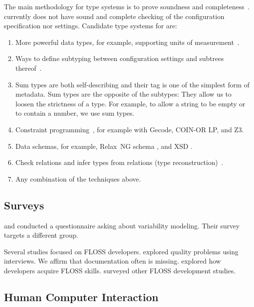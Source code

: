 The main methodology for type systems is to prove soundness and completeness~\cite{pierce2002types}.
 currently does not have sound and complete checking of the configuration specification nor settings.
Candidate type systems for \elektra{} are:

\begin{enumerate}
\item More powerful data types, for example, supporting units of measurement~\cite{pierce2002types,dhungana2013generation}.
\item Ways to define subtyping between configuration settings and subtrees thereof~\cite{pierce2002types}.
\item Sum types are both self-describing and their tag is one of the simplest form of metadata.
Sum types are the opposite of the subtypes:
They allow us to loosen the strictness of a type.
For example, to allow a string to be empty or to contain a number, we use sum types.
\item Constraint programming~\cite{fruhwirth2003essentials}, for example with Gecode, COIN-OR LP, and Z3.
\item Data schemas, for example, Relax~NG schema \cite{clark2002relax}, and XSD \cite{wadler2003xml}.
\item Check relations and infer types from relations (type reconstruction)~\cite{pierce2002types,harkes2016icedust}.
\item Any combination of the techniques above.
\end{enumerate}


\subsection{Surveys}

\citet{berger2013survey} and \citet{villela2014survey} conducted a questionnaire asking about variability modeling.
Their survey targets a different group.

Several studies focused on FLOSS developers.
\citet{michlmayr2005quality} explored quality problems using interviews.
We affirm that documentation often is missing.
\citet{barcomb2015developers} explored how developers acquire FLOSS skills.
\citet{crowston2012free} surveyed other FLOSS development studies.


\subsection{Human Computer Interaction}

